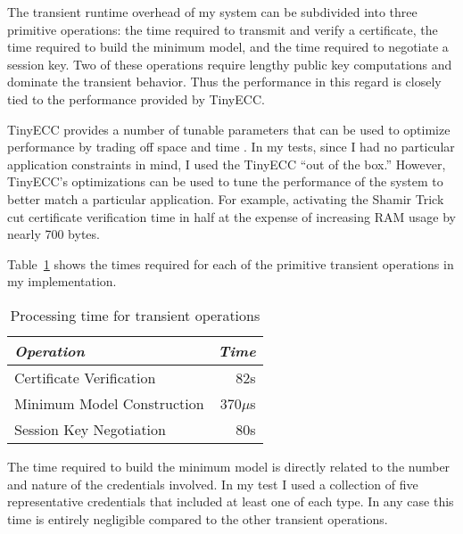 The transient runtime overhead of my system can be subdivided into three primitive operations:
the time required to transmit and verify a certificate, the time required to build the minimum
model, and the time required to negotiate a session key. Two of these operations require lengthy
public key computations and dominate the transient behavior. Thus the performance in this regard
is closely tied to the performance provided by TinyECC.

TinyECC provides a number of tunable parameters that can be used to optimize performance by
trading off space and time \cite{Liu-Peng-TinyECC-2008}. In my tests, since I had no particular
application constraints in mind, I used the TinyECC ``out of the box.'' However, TinyECC's
optimizations can be used to tune the performance of the system to better match a particular
application. For example, activating the Shamir Trick cut certificate verification time in half
at the expense of increasing RAM usage by nearly 700 bytes.

Table~\ref{table-transient-time} shows the times required for each of the primitive transient
operations in my implementation.

\begin{table}[tbhp]
  \newcommand\T{\rule{0pt}{2.1ex}}
  \centering
  \caption{Processing time for transient operations}
  {
  \begin{tabular}{|l|r|} \hline
    \textit{Operation} \T & \textit{Time} \\ \hline \hline

    Certificate Verification     \T &  82s \\ \hline 
    Minimum Model Construction   \T & 370$\mu$s \\ \hline
    Session Key Negotiation      \T &  80s\\ \hline
  \end{tabular}
  }
  \label{table-transient-time}
\end{table}

The time required to build the minimum model is directly related to the number and nature of the
credentials involved. In my test I used a collection of five representative credentials that
included at least one of each type. In any case this time is entirely negligible compared to the
other transient operations.


